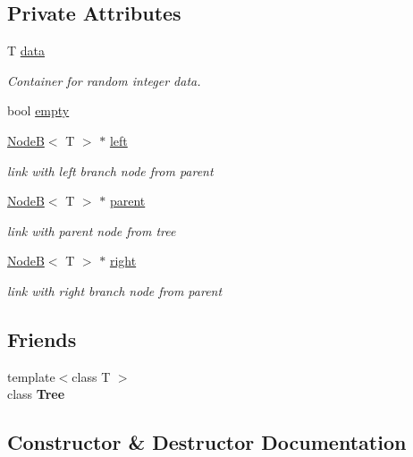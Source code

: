 \subsection*{Private Attributes}
\begin{DoxyCompactItemize}
\item 
T \hyperlink{class_node_b_a9ce10550e81de48553bf37679a491ef5}{data}
\begin{DoxyCompactList}\small\item\em Container for random integer data. \end{DoxyCompactList}\item 
bool \hyperlink{class_node_b_a62077bf9d12b532c6177544bce9947d0}{empty}
\item 
\hyperlink{class_node_b}{Node\+B}$<$ T $>$ $\ast$ \hyperlink{class_node_b_a8d8ba7388e899b41d6a50ba3e910d065}{left}
\begin{DoxyCompactList}\small\item\em link with left branch node from parent \end{DoxyCompactList}\item 
\hyperlink{class_node_b}{Node\+B}$<$ T $>$ $\ast$ \hyperlink{class_node_b_afba2126c75ecfa0d8e3320c07e3257dc}{parent}
\begin{DoxyCompactList}\small\item\em link with parent node from tree \end{DoxyCompactList}\item 
\hyperlink{class_node_b}{Node\+B}$<$ T $>$ $\ast$ \hyperlink{class_node_b_a91e0cdfcaf563461d96079054627ced4}{right}
\begin{DoxyCompactList}\small\item\em link with right branch node from parent \end{DoxyCompactList}\end{DoxyCompactItemize}
\subsection*{Friends}
\begin{DoxyCompactItemize}
\item 
\hypertarget{class_node_b_aa2f9f90efcd38311bf153da95f3561c0}{}{\footnotesize template$<$class T $>$ }\\class {\bfseries Tree}\label{class_node_b_aa2f9f90efcd38311bf153da95f3561c0}

\end{DoxyCompactItemize}


\subsection{Constructor \& Destructor Documentation}
\hypertarget{class_node_b_a5ef89d0aa079d6d7661eb9eeefd8ad2d}{}
